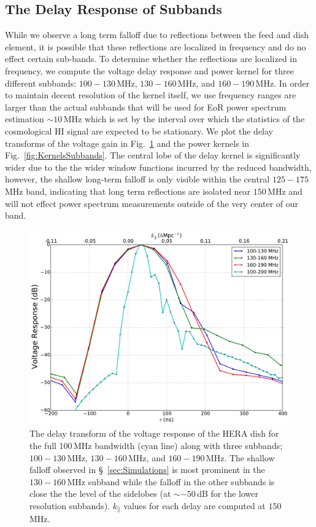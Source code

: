 \documentclass[twocolumn]{emulateapj}
\begin{document}
\subsection{The Delay Response of Subbands}\label{ssec:Subbands}
While we observe a long term falloff due to reflections between the feed and dish element, it is possible that these reflections are localized in frequency and do no effect certain sub-bands. To determine whether the reflections are localized in frequency, we compute the voltage delay response and power kernel for three different subbands: $100-130$\,MHz, $130-160$\,MHz, and $160-190$\,MHz. In order to maintain decent resolution of the kernel itself, we use frequency ranges are larger than the actual subbands that will be used for EoR power spectrum estimation $\sim 10$\,MHz which is set by the interval over which the statistics of the cosmological HI signal are expected to be stationary. We plot the delay transforms of the voltage gain in Fig.~\ref{fig:GainDelaySubbands} and the power kernels in Fig.~\ref{fig:KernelsSubbands}. The central lobe of the delay kernel is significantly wider due to the the wider window functions incurred by the reduced bandwidth, however, the shallow long-term falloff is only visible within the central $125-175$\,MHz band, indicating that long term reflections are isolated near $150$\,MHz and will not effect power spectrum measurements outside of the very center of our band.

\begin{figure}[h!]
\includegraphics[width=.5\textwidth]{figures/voltageResponseSubbands.pdf}
\caption{The delay transform of the voltage response of the HERA dish for the full 100\,MHz bandwidth (cyan line) along with three subbands; $100-130$\,MHz, $130-160$\,MHz, and $160-190$\,MHz. The shallow falloff observed in \S~\ref{sec:Simulations} is most prominent in the $130-160$\,MHz subband while the falloff in the other subbands is close the the level of the sidelobes (at $\sim -50$\,dB for the lower resolution subbands). $k_\parallel$ values for each delay are computed at $150$\,MHz.}
\label{fig:GainDelaySubbands}
\end{figure}
\end{document}
